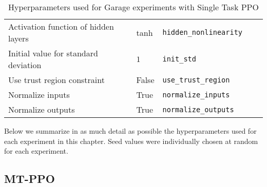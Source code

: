 \begin{table}[h!]
\begin{tabularx}{\linewidth}{ L{1.5in} X X X l }
    Activation function of hidden layers & tanh & \texttt{hidden\_nonlinearity} \\
    Initial value for standard deviation & $1$ & \texttt{init\_std} \\
    Use trust region constraint & False & \texttt{use\_trust\_region} \\
    Normalize inputs & True & \texttt{normalize\_inputs} \\
    Normalize outputs & True & \texttt{normalize\_outputs} \\
    \bottomrule
\end{tabularx}
\caption{Hyperparameters used for Garage experiments with Single Task PPO}
\label{tab:garage_st_ppo_hparams}
\end{table}



Below we summarize in as much detail as possible the hyperparameters used for each experiment in this chapter.
Seed values were individually chosen at random for each experiment.

\clearpage
\subsection{MT-PPO}

